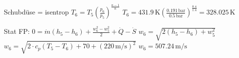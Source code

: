 Schubdüse = isentrop  
\( T_6 = T_5 \left( \frac{p_6}{p_5} \right)^{\frac{n-1}{n}} \)  
\( T_6 = 431.9 \, \text{K} \left( \frac{0.191 \, \text{bar}}{0.5 \, \text{bar}} \right)^{\frac{0.4}{1.4}} = 328.025 \, \text{K} \)  

Stat FP:  
\( 0 = \dot{m} (h_5 - h_6) + \frac{w_6^2 - w_5^2}{2} + \dot{Q} - \dot{S} \)  
\( w_6 = \sqrt{2 (h_5 - h_6) + w_5^2} \)  
\( w_6 = \sqrt{2 \cdot c_p (T_5 - T_6) + 70 + (220 \, \text{m/s})^2} \)  
\( w_6 = 507.24 \, \text{m/s} \)